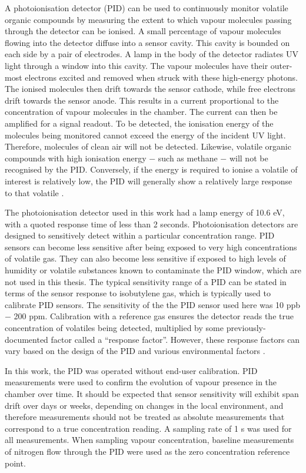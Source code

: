 \documentclass[
  a4paper,
]{scrbook}
\begin{document}
A photoionisation detector (PID) can be used to continuously monitor
volatile organic compounds by measuring the extent to which vapour
molecules passing through the detector can be ionised. A small
percentage of vapour molecules flowing into the detector diffuse into a
sensor cavity. This cavity is bounded on each side by a pair of
electrodes. A lamp in the body of the detector radiates UV light through
a window into this cavity. The vapour molecules have their outer-most
electrons excited and removed when struck with these high-energy
photons. The ionised molecules then drift towards the sensor cathode,
while free electrons drift towards the sensor anode. This results in a
current proportional to the concentration of vapour molecules in the
chamber. The current can then be amplified for a signal readout. To be
detected, the ionisation energy of the molecules being monitored cannot
exceed the energy of the incident UV light. Therefore, molecules of
clean air will not be detected. Likewise, volatile organic compounds
with high ionisation energy \(-\) such as methane \(-\) will not be
recognised by the PID. Conversely, if the energy is required to ionise a
volatile of interest is relatively low, the PID will generally show a
relatively large response to that volatile
\autocite{Ionscience,PIDmanual}.

The photoionisation detector used in this work had a lamp energy of 10.6
eV, with a quoted response time of less than 2 seconds. Photoionisation
detectors are designed to sensitively detect within a particular
concentration range. PID sensors can become less sensitive after being
exposed to very high concentrations of volatile gas. They can also
become less sensitive if exposed to high levels of humidity or volatile
substances known to contaminate the PID window, which are not used in
this thesis. The typical sensitivity range of a PID can be stated in
terms of the sensor response to isobutylene gas, which is typically used
to calibrate PID sensors. The sensitivity of the the PID sensor used
here was 10 ppb \(-\) 200 ppm. Calibration with a reference gas ensures
the detector reads the true concentration of volatiles being detected,
multiplied by some previously-documented factor called a ``response
factor''. However, these response factors can vary based on the design
of the PID and various environmental factors
\autocite{Ionscience,PIDmanual}.

In this work, the PID was operated without end-user calibration. PID
measurements were used to confirm the evolution of vapour presence in
the chamber over time. It should be expected that sensor sensitivity
will exhibit span drift over days or weeks, depending on changes in the
local environment, and therefore measurements should not be treated as
absolute measurements that correspond to a true concentration reading. A
sampling rate of 1 s was used for all measurements. When sampling vapour
concentration, baseline measurements of nitrogen flow through the PID
were used as the zero concentration reference point.
\end{document}
